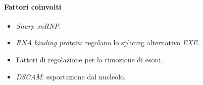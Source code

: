			\paragraph{Fattori coinvolti}
			\begin{multicols}{2}
				\begin{itemize}
					\item \emph{Snurp snRNP}.
					\item \emph{RNA binding protein}: regolano lo splicing alternativo \emph{EXE}.
					\item Fattori di regolazione per la rimozione di esoni.
					\item \emph{DSCAM}: esportazione dal nucleolo.
				\end{itemize}
			\end{multicols}
			
